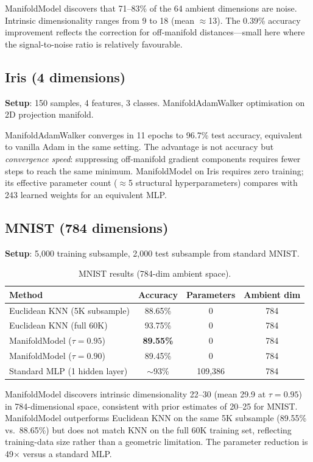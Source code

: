 \documentclass[12pt,letterpaper]{article}
\begin{document}
ManifoldModel discovers that 71--83\% of the 64 ambient dimensions are noise.
Intrinsic dimensionality ranges from 9 to 18 (mean $\approx$13).  The 0.39\%
accuracy improvement reflects the correction for off-manifold distances---small
here where the signal-to-noise ratio is relatively favourable.

\subsection{Iris (4 dimensions)}

\textbf{Setup}: 150 samples, 4 features, 3 classes.  ManifoldAdamWalker
optimisation on 2D projection manifold.

ManifoldAdamWalker converges in 11 epochs to 96.7\% test accuracy, equivalent
to vanilla Adam in the same setting.  The advantage is not accuracy but
\emph{convergence speed}: suppressing off-manifold gradient components requires
fewer steps to reach the same minimum.  ManifoldModel on Iris requires zero
training; its effective parameter count ($\approx$5 structural hyperparameters)
compares with 243 learned weights for an equivalent MLP.

\subsection{MNIST (784 dimensions)}

\textbf{Setup}: 5{,}000 training subsample, 2{,}000 test subsample from
standard MNIST.

\begin{table}[h]
\centering
\caption{MNIST results (784-dim ambient space).}
\label{tab:mnist}
\begin{tabular}{lccc}
\toprule
Method & Accuracy & Parameters & Ambient dim \\
\midrule
Euclidean KNN (5K subsample) & 88.65\% & 0 & 784 \\
Euclidean KNN (full 60K)     & 93.75\% & 0 & 784 \\
ManifoldModel ($\tau{=}0.95$) & \textbf{89.55\%} & 0 & 784 \\
ManifoldModel ($\tau{=}0.90$) & 89.45\% & 0 & 784 \\
Standard MLP (1 hidden layer) & $\sim$93\% & 109{,}386 & 784 \\
\bottomrule
\end{tabular}
\end{table}

ManifoldModel discovers intrinsic dimensionality 22--30 (mean 29.9 at $\tau{=}0.95$)
in 784-dimensional space, consistent with prior estimates of 20--25 for MNIST.
ManifoldModel outperforms Euclidean KNN on the same 5K subsample (89.55\%
vs.\ 88.65\%) but does not match KNN on the full 60K training set, reflecting
training-data size rather than a geometric limitation.
The parameter reduction is 49$\times$ versus a standard MLP.
\end{document}
